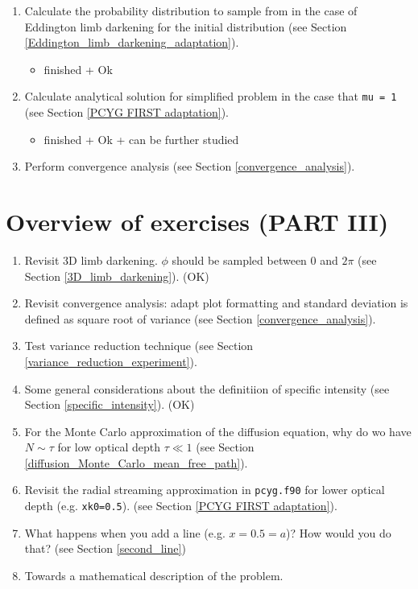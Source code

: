 \documentclass[../main/main.tex]{subfiles}
\begin{document}
\begin{enumerate}
\item Calculate the probability distribution to sample from in the case of Eddington limb darkening for the initial distribution (see Section \underline{\ref{Eddington_limb_darkening_adaptation}}).
\begin{itemize}
\item finished + Ok
\end{itemize}

\item Calculate analytical solution for simplified problem in the case that \texttt{mu = 1} (see Section \underline{\ref{PCYG FIRST adaptation}}).
\begin{itemize}
\item finished + Ok + can be further studied
\end{itemize}

\item Perform convergence analysis (see Section \underline{\ref{convergence_analysis}}).
\end{enumerate}

\section{Overview of exercises (PART III)}
\label{Overview_Part_3}

\begin{enumerate}
\item Revisit 3D limb darkening. $\phi$ should be sampled between $0$ and $2\pi$ (see Section \underline{\ref{3D_limb_darkening}}). (OK)

\item Revisit convergence analysis: adapt plot formatting and standard deviation is defined as square root of variance (see Section \underline{\ref{convergence_analysis}}).

\item Test variance reduction technique (see Section \underline{\ref{variance_reduction_experiment}}).   

\item Some general considerations about the definitiion of specific intensity (see Section \underline{\ref{specific_intensity}}). (OK)

\item For the Monte Carlo approximation of the diffusion equation, why do wo have $N \sim \tau$ for low optical depth $\tau \ll 1$ (see Section \underline{\ref{diffusion_Monte_Carlo_mean_free_path}}).

\item Revisit the radial streaming approximation in \texttt{pcyg.f90} for lower optical depth (e.g. \texttt{xk0=0.5}).
(see Section \underline{\ref{PCYG FIRST adaptation}}).

\item What happens when you add a line (e.g. \@ $x=0.5=a$)? How would you do that? (see Section \underline{\ref{second_line}}) 

\item Towards a mathematical description of the problem.
\end{enumerate}
\end{document}
